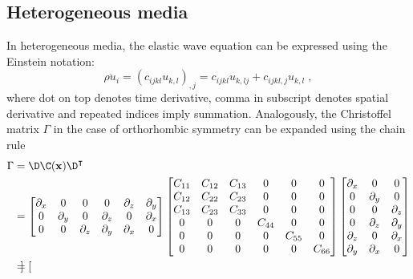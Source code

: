 \subsection{Heterogeneous media}
In heterogeneous media, the elastic wave equation can be expressed using the Einstein notation:
\begin{equation}
    \rho \ddot{u}_i = (c_{ijkl} u_{k,l})_{,j} = c_{ijkl} u_{k,lj} + c_{ijkl,j} u_{k,l} \;,
\end{equation}
where dot on top denotes time derivative, comma in subscript denotes spatial derivative and repeated indices imply summation. Analogously, the Christoffel matrix $\Gamma$ in the case of orthorhombic symmetry can be expanded using the chain rule
\begin{align}
    \Gamma 
    &= \D \C(\mathbf{x}) \D^\intercal \\ \nonumber
    &= 
    \begin{bmatrix}
        \partial_x & 0 & 0 & 0 & \partial_z & \partial_y \\
        0 & \partial_y & 0 & \partial_z & 0 & \partial_x \\
        0 & 0 & \partial_z & \partial_y & \partial_x & 0
    \end{bmatrix}
    \begin{bmatrix}
        C_{11} & C_{12} & C_{13} & 0 & 0 & 0                \\
        C_{12} & C_{22} & C_{23} & 0 & 0 & 0                \\
        C_{13} & C_{23} & C_{33} & 0 & 0 & 0                \\
        0      & 0      & 0      & C_{44} & 0      & 0      \\
        0      & 0      & 0      & 0      & C_{55} & 0      \\
        0      & 0      & 0      & 0      & 0      & C_{66}
    \end{bmatrix}
    \begin{bmatrix}
        \partial_x & 0 & 0\\
        0 & \partial_y & 0\\
        0 & 0 & \partial_z\\
        0 & \partial_z & \partial_y\\
        \partial_z & 0 & \partial_x\\
        \partial_y & \partial_x & 0
    \end{bmatrix} \\ \nonumber
    &=
    \begin{bmatrix}

\end{bmatrix}
\end{align}
